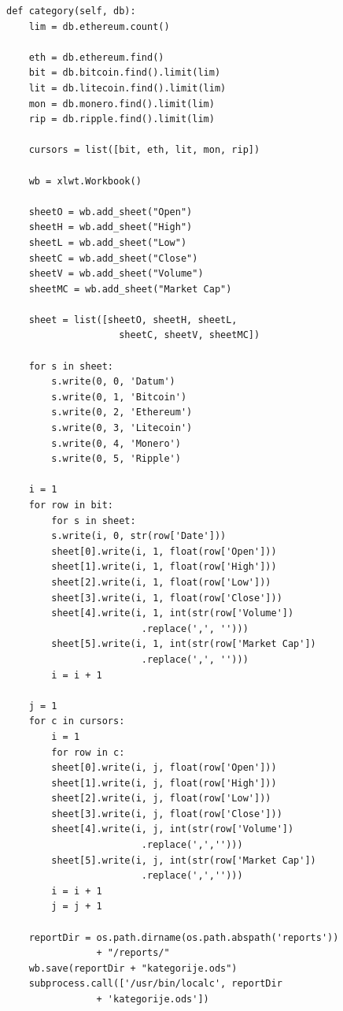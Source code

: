 \documentclass[a4paper,12pt]{foi}
\begin{document}
\lstset{commentstyle=\textit,language=python}
\begin{lstlisting}[frame=tb]
def category(self, db):
	lim = db.ethereum.count()

	eth = db.ethereum.find()
	bit = db.bitcoin.find().limit(lim)
	lit = db.litecoin.find().limit(lim)
	mon = db.monero.find().limit(lim)
	rip = db.ripple.find().limit(lim)

	cursors = list([bit, eth, lit, mon, rip])

	wb = xlwt.Workbook()

	sheetO = wb.add_sheet("Open")
	sheetH = wb.add_sheet("High")
	sheetL = wb.add_sheet("Low")
	sheetC = wb.add_sheet("Close")
	sheetV = wb.add_sheet("Volume")
	sheetMC = wb.add_sheet("Market Cap")

	sheet = list([sheetO, sheetH, sheetL, 
					sheetC, sheetV, sheetMC])

	for s in sheet:
	    s.write(0, 0, 'Datum')
	    s.write(0, 1, 'Bitcoin')
	    s.write(0, 2, 'Ethereum')
	    s.write(0, 3, 'Litecoin')
	    s.write(0, 4, 'Monero')
	    s.write(0, 5, 'Ripple')

	i = 1
	for row in bit:
	    for s in sheet:
		s.write(i, 0, str(row['Date']))
	    sheet[0].write(i, 1, float(row['Open']))
	    sheet[1].write(i, 1, float(row['High']))
	    sheet[2].write(i, 1, float(row['Low']))
	    sheet[3].write(i, 1, float(row['Close']))
	    sheet[4].write(i, 1, int(str(row['Volume'])
	    				.replace(',', '')))
	    sheet[5].write(i, 1, int(str(row['Market Cap'])
	    				.replace(',', '')))
	    i = i + 1

	j = 1
	for c in cursors:
	    i = 1
	    for row in c:
		sheet[0].write(i, j, float(row['Open']))
		sheet[1].write(i, j, float(row['High']))
		sheet[2].write(i, j, float(row['Low']))
		sheet[3].write(i, j, float(row['Close']))
		sheet[4].write(i, j, int(str(row['Volume'])
						.replace(',','')))
		sheet[5].write(i, j, int(str(row['Market Cap'])
						.replace(',','')))
		i = i + 1
	    j = j + 1

	reportDir = os.path.dirname(os.path.abspath('reports')) 
				+ "/reports/"
	wb.save(reportDir + "kategorije.ods")
	subprocess.call(['/usr/bin/localc', reportDir 
				+ 'kategorije.ods'])
\end{lstlisting}
\end{document}
